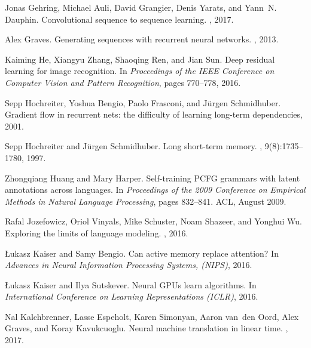 \documentclass{article}
\begin{document}
\begin{thebibliography}{10}
  Jonas Gehring, Michael Auli, David Grangier, Denis Yarats, and Yann~N. Dauphin.
  \newblock Convolutional sequence to sequence learning.
  , 2017.

  Alex Graves.
  \newblock Generating sequences with recurrent neural networks.
  , 2013.

  Kaiming He, Xiangyu Zhang, Shaoqing Ren, and Jian Sun.
  \newblock Deep residual learning for image recognition.
  \newblock In {\em Proceedings of the IEEE Conference on Computer Vision and
      Pattern Recognition}, pages 770--778, 2016.

  Sepp Hochreiter, Yoshua Bengio, Paolo Frasconi, and J{\"u}rgen Schmidhuber.
  \newblock Gradient flow in recurrent nets: the difficulty of learning long-term
  dependencies, 2001.

  Sepp Hochreiter and J{\"u}rgen Schmidhuber.
  \newblock Long short-term memory.
  , 9(8):1735--1780, 1997.

  Zhongqiang Huang and Mary Harper.
  \newblock Self-training {PCFG} grammars with latent annotations across
  languages.
  \newblock In {\em Proceedings of the 2009 Conference on Empirical Methods in
      Natural Language Processing}, pages 832--841. ACL, August 2009.

  Rafal Jozefowicz, Oriol Vinyals, Mike Schuster, Noam Shazeer, and Yonghui Wu.
  \newblock Exploring the limits of language modeling.
  , 2016.

  {\L}ukasz Kaiser and Samy Bengio.
  \newblock Can active memory replace attention?
  \newblock In {\em Advances in Neural Information Processing Systems, ({NIPS})},
  2016.

  \L{}ukasz Kaiser and Ilya Sutskever.
  \newblock Neural {GPU}s learn algorithms.
  \newblock In {\em International Conference on Learning Representations
      ({ICLR})}, 2016.

  Nal Kalchbrenner, Lasse Espeholt, Karen Simonyan, Aaron van~den Oord, Alex
  Graves, and Koray Kavukcuoglu.
  \newblock Neural machine translation in linear time.
  , 2017.


\end{thebibliography}
\end{document}
